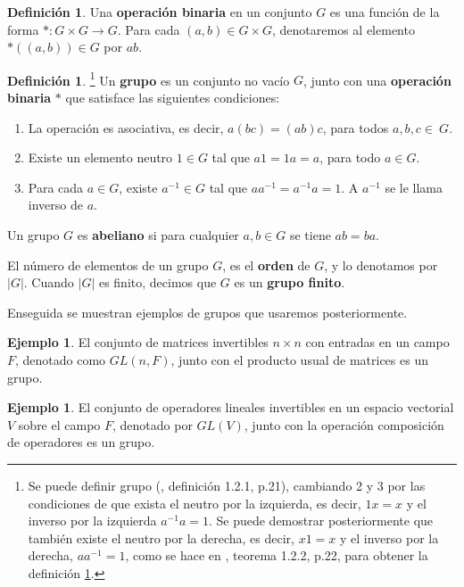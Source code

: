 \documentclass[12pt]{book}
\theoremstyle{definition}
\newtheorem{definition}[theorem]{Definición}
\newtheorem{example}[theorem]{Ejemplo}
\newcounter{in}
\newcounter{ini}
\begin{document}
\begin{definition}
  Una \textbf{operación binaria} en un conjunto $G$ es una función
  de la forma $*:G  \times G \rightarrow G$. Para cada $(a,b)\in G
  \times G$, denotaremos al elemento~$*((a,b))\in G$ por $ab$. 
\end{definition} 

\begin{definition}\footnote{Se puede definir grupo (\cite{barrera},
    definición 1.2.1, p.21), cambiando 2 y 3 por las condiciones de que exista el neutro por la izquierda, es decir, $1x=x$ y el inverso
    por la izquierda $a^{-1}a=1$. Se puede demostrar posteriormente que también
    existe el neutro por la derecha, es decir, $x1=x$ y el inverso por
    la derecha, $aa^{-1}=1$, como se hace en \cite{barrera}, teorema
    1.2.2, p.22, para obtener la definición \ref{def-grupo}.}
  \label{def-grupo}
  Un \textbf{grupo} es un conjunto no vacío $G$, junto con una
  \textbf{operación binaria} $*$ que satisface las siguientes condiciones:
    \begin{enumerate}
    \item La operación es asociativa, es decir, $a(bc)=(ab)c$, para
      todos $a,b,c\in~G$.
    \item Existe un elemento neutro $1 \in G$ tal que $a1=1a=a$, para
      todo $a \in G$.
    \item Para cada $a \in G$, existe $a^{-1} \in G$ tal que
      $aa^{-1}=a^{-1}a=1$. A $a^{-1}$ se le llama inverso de $a$.
    \end{enumerate}
Un grupo $G$ es \textbf{abeliano} si para cualquier $a,b\in G$ se tiene $ab=ba$.
\end{definition}
El número de elementos de un grupo $G$, es el \textbf{orden} de $G$, y
lo denotamos por $|G|$. Cuando $|G|$ es finito, decimos que $G$ es un
\textbf{grupo finito}.

Enseguida se muestran ejemplos de grupos que usaremos posteriormente.
\begin{example}
  \label{GL(nF)}
  El conjunto de matrices invertibles $n \times n$ con
  entradas en un campo $F$, denotado como $GL(n,F)$, junto con el
  producto usual de matrices es un grupo.  
\end{example}

\begin{example}
  \label{GL(V)}
  El conjunto de operadores lineales invertibles en un espacio vectorial $V$
  sobre el campo $F$, denotado por $GL(V)$, junto con la
  operación composición de operadores es un grupo.
\end{example}
\end{document}
